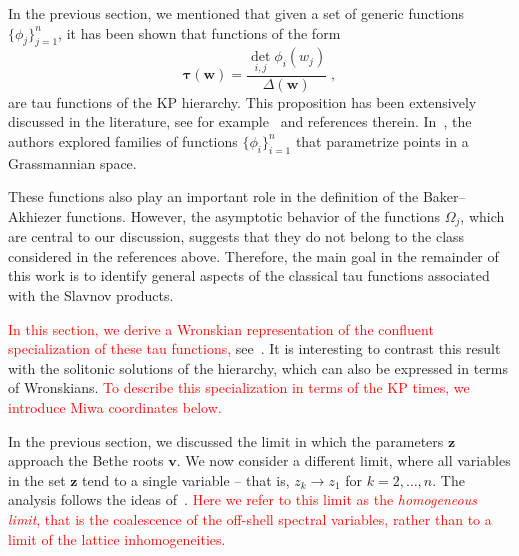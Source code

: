 \documentclass[a4paper,11pt]{amsart}
\begin{document}
In the previous section, we mentioned that given a set of generic functions \(\{\phi_j\}_{j=1}^n\),
it has been shown that functions of the form
\begin{equation}
\label{eq:general-tau}
\bm{\tau}(\bm{w}) = \frac{\det_{i,j} \phi_i(w_j)}{\Delta(\bm{w})}\;,
\end{equation}
are tau functions of the KP hierarchy. This proposition has been extensively discussed in the
literature, see for example~\cite{Segal:1985aga, Kharchev:1991cy, Araujo:2021ghu} and references
therein. In~\cite{Segal:1985aga, Kharchev:1991cy, Alexandrov:2014cwa}, the authors explored families
of functions \(\{ \phi_i \}_{i=1}^n\) that parametrize points in a Grassmannian space.

These functions also play an important role in the definition of the Baker--Akhiezer
functions. However, the asymptotic behavior of the functions \(\Omega_j\), which are central to our
discussion, suggests that they do not belong to the class considered in the references
above. Therefore, the main goal in the remainder of this work is to identify general aspects of the
classical tau functions associated with the Slavnov products.

\textcolor{red}{In this section, we derive a Wronskian representation of the confluent
  specialization of these tau functions,} see~\cite{Kodama2018}. It is interesting to contrast this
result with the solitonic solutions of the hierarchy, which can also be expressed in terms of
Wronskians. \textcolor{red}{To describe this specialization in terms of the KP times, we introduce Miwa coordinates
below.}

In the previous section, we discussed the limit in which the parameters \(\bm{z}\) approach the
Bethe roots \(\bm{v}\).  We now consider a different limit, where all variables in the set
\(\bm{z}\) tend to a single variable -- that is, \(z_k\to z_1\) for \(k=2,\dots, n\). The analysis
follows the ideas of~\cite{Izergin:1991rs}. \textcolor{red}{Here we refer to this limit as the
\emph{homogeneous limit}, that is the coalescence of the off-shell spectral variables, rather than
to a limit of the lattice inhomogeneities.}
\end{document}
